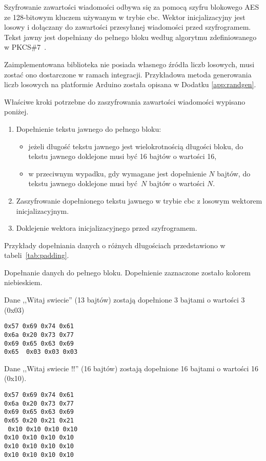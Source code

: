 Szyfrowanie zawartości wiadomości odbywa się za pomocą szyfru blokowego AES ze 128-bitowym kluczem używanym w trybie \gls{cbc}. Wektor inicjalizacyjny jest losowy i dołączany do zawartości przesyłanej wiadomości przed szyfrogramem. Tekst jawny jest dopełniany do pełnego bloku według algorytmu zdefiniowanego w PKCS\#7~\cite{kaliski1998pkcs}.

Zaimplementowana biblioteka nie posiada własnego źródła liczb losowych, musi zostać ono dostarczone w ramach integracji. Przykładowa metoda generowania liczb losowych na platformie Arduino została opisana w Dodatku \ref{app:randgen}.

Właściwe kroki potrzebne do zaszyfrowania zawartości wiadomości wypisano poniżej.

\begin{enumerate}
\item Dopełnienie tekstu jawnego do pełnego bloku:
\begin{itemize}
\item jeżeli długość tekstu jawnego jest wielokrotnością długości bloku, do tekstu jawnego doklejone musi być 16 bajtów o wartości 16,
\item w przeciwnym wypadku, gdy wymagane jest dopełnienie $ N $ bajtów, do tekstu jawnego doklejone musi być $ N $ bajtów o wartości $ N $.
\end{itemize}
\item Zaszyfrowanie dopełnionego tekstu jawnego w trybie \gls{cbc} z losowym wektorem inicjalizacyjnym.
\item Doklejenie wektora inicjalizacyjnego przed szyfrogramem.
\end{enumerate}

Przykłady dopełniania danych o różnych długościach przedstawiono w tabeli~\ref{tab:padding}.

\begin{table}[t]
\centering
\caption{Dopełnanie danych do pełnego bloku. Dopełnienie zaznaczone zostało kolorem niebieskiem.}
Dane ,,Witaj swiecie'' (13 bajtów) zostają dopełnione 3 bajtami o wartości 3 (0x03)

\texttt{0x57 0x69 0x74 0x61\\
0x6a 0x20 0x73 0x77\\
0x69 0x65 0x63 0x69\\
0x65 {\color[rgb]{0,0,1} 0x03 0x03 0x03}}

Dane ,,Witaj swiecie !!'' (16 bajtów) zostają dopełnione 16 bajtami o wartości 16 (0x10).

\texttt{0x57 0x69 0x74 0x61\\
0x6a 0x20 0x73 0x77\\
0x69 0x65 0x63 0x69\\
0x65 0x20 0x21 0x21\\
{\color[rgb]{0,0,1}
0x10 0x10 0x10 0x10\\
0x10 0x10 0x10 0x10\\
0x10 0x10 0x10 0x10\\
0x10 0x10 0x10 0x10\\
}
}

\label{tab:padding}
\end{table}

